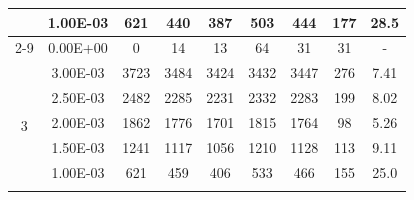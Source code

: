 \begin{table}[H]
{\begin{tabular}{|c|c|c|c|c|c|c|c|c|}
                               & 1.00E-03         & 621       & 440                                                        & 387                                                       & 503                                                       & 444     & 177    & 28.5                                                               \\ \cline{2-9}
                               & 0.00E+00         & 0         & 14                                                         & 13                                                        & 64                                                        & 31      & 31     & -                                                                  \\ \hline
            \multirow{6}{*}{3} & 3.00E-03         & 3723      & 3484                                                       & 3424                                                      & 3432                                                      & 3447    & 276    & 7.41                                                               \\ \cline{2-9}
                               & 2.50E-03         & 2482      & 2285                                                       & 2231                                                      & 2332                                                      & 2283    & 199    & 8.02                                                               \\ \cline{2-9}
                               & 2.00E-03         & 1862      & 1776                                                       & 1701                                                      & 1815                                                      & 1764    & 98     & 5.26                                                               \\ \cline{2-9}
                               & 1.50E-03         & 1241      & 1117                                                       & 1056                                                      & 1210                                                      & 1128    & 113    & 9.11                                                               \\ \cline{2-9}
                               & 1.00E-03         & 621       & 459                                                        & 406                                                       & 533                                                       & 466     & 155    & 25.0                                                               \\ \cline{2-9}

\end{tabular}}
\end{table}
